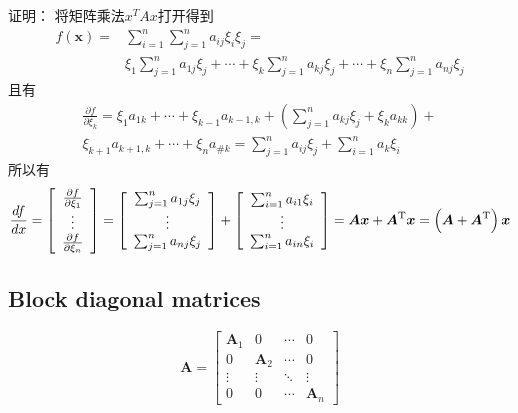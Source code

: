 \documentclass[
]{book}
\theoremstyle{definition}
\theoremstyle{definition}
\theoremstyle{definition}
\theoremstyle{remark}
\begin{document}
证明：
将矩阵乘法\(x^TAx\)打开得到
\[
\begin{aligned} f(\boldsymbol{x})=& \sum_{i=1}^{n} \sum_{j=1}^{n} a_{i j} \xi_{i} \xi_{j}=\\ & \xi_{1} \sum_{j=1}^{n} a_{1 j} \xi_{j}+\cdots+\xi_{k} \sum_{j=1}^{n} a_{k j} \xi_{j}+\cdots+\xi_{n} \sum_{j=1}^{n} a_{n j} \xi_{j} \end{aligned}
\]
且有
\[
\begin{align}
\frac{\partial f}{\partial \xi_{k}}=\xi_{1} a_{1 k}+\cdots+\xi_{k-1} a_{k-1, k}+\left(\sum_{j=1}^{n} a_{k j} \xi_{j}+\xi_{k} a_{k k}\right)+\\
\xi_{k+1} a_{k+1, k}+\cdots+\xi_{n} a_{\# k}=\sum_{j=1}^{n} a_{i j} \xi_{j}+\sum_{i=1}^{n} a_{k} \xi_{i}
\end{align}
\]
所以有
\[
\frac{d f}{d x}=\left[ \begin{array}{c}{\frac{\partial f}{\partial \xi_{1}}} \\ {\vdots} \\ {\frac{\partial f}{\partial \xi_{n}}}\end{array}\right]=\left[ \begin{array}{c}{\sum_{j=1}^{n} a_{1 j} \xi_{j}} \\ {\vdots} \\ {\sum_{j=1}^{n} a_{n j} \xi_{j}}\end{array}\right]+\left[ \begin{array}{c}{\sum_{i=1}^{n} a_{i 1} \xi_{i}} \\ {\vdots} \\ {\sum_{i=1}^{n} a_{i n} \xi_{i}}\end{array}\right]=\\ 
\boldsymbol{A x}+\boldsymbol{A}^{\mathrm{T}} \boldsymbol{x}=\left(\boldsymbol{A}+\boldsymbol{A}^{\mathrm{T}}\right) \boldsymbol{x}
\]

\hypertarget{block-diagonal-matrices}{%
\subsection{Block diagonal matrices}\label{block-diagonal-matrices}}

\[
\mathbf{A}=\left[ \begin{array}{cccc}{\mathbf{A}_{1}} & {0} & {\cdots} & {0} \\ {0} & {\mathbf{A}_{2}} & {\cdots} & {0} \\ {\vdots} & {\vdots} & {\ddots} & {\vdots} \\ {0} & {0} & {\cdots} & {\mathbf{A}_{n}}\end{array}\right]
\]
\end{document}
